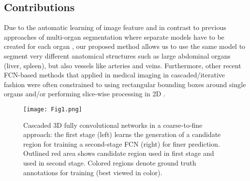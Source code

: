 \documentclass[authoryear]{elsarticle}
\begin{document}
\subsection{Contributions}
Due to the automatic learning of image feature and in contrast to previous approaches of multi-organ segmentation where separate models have to be created for each organ \citep{oda2016regression,tong2015discriminative}, our proposed method allows us to use the same model to segment very different anatomical structures such as large abdominal organs (liver, spleen), but also vessels like arteries and veins. Furthermore, other recent FCN-based methods that applied in medical imaging in cascaded/iterative fashion were often constrained to using rectangular bounding boxes around single organs \citep{roth2017spatial,zhou2016pancreas} and/or performing slice-wise processing in 2D \citep{christ2016automatic,zhou2016three}.
\begin{figure}[htb]
	\centering
	\texttt{[image: Fig1.png]}
	\caption{Cascaded 3D fully convolutional networks in a coarse-to-fine approach: the first stage (left) learns the generation of a candidate region for training a second-stage FCN (right) for finer prediction.  Outlined red area shows candidate region  used in first stage and  used in second stage. Colored regions denote ground truth annotations for training (best viewed in color).}
	\label{fig:coarse-to-fine}
\end{figure}
\end{document}
